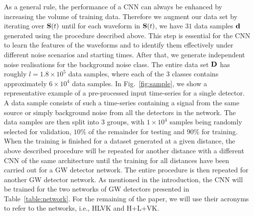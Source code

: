 \documentclass[aps,twocolumn,showpacs,groupedaddress, nofootinbib]{revtex4}  %
\newcommand{\cm}[1]{\textbf{\textcolor{red}{CM: #1}}}
\begin{document}
%
%
As a general rule, the performance of a \ac{CNN} can always be enhanced by
increasing the volume of training data. Therefore we augment our data set by
iterating over $\bold{S}(t)$ until for each waveform in $\bold{S}(t)$, we have
$31$ data samples $\bold{d}$ generated using the procedure described above.
This step is essential for the \ac{CNN} to learn the features of the waveforms
and to identify them effectively under different noise scenarios and starting
times.  After that, we generate independent noise realisations for the
background noise class. The entire data set $\bold{D}$ has
roughly $l = 1.8 \times 10^{5}$ data samples, where each of the 3 classes
contains approximately $6\times10^{4}$ data samples.
%
%
%
%
In Fig.~\ref{fig:sample}, we show a representative example of a pre-processed
input time-series for a single detector. A data sample consists of such a
time-series containing a signal from the same source or simply background noise
from all the detectors in the network. The data samples are then split into 3
groups, with $1\times10^{4}$ samples being randomly selected for validation,
$10\%$ of the remainder for testing and $90\%$ for training. When the training
is finished for a dataset generated at a given distance, the above described
procedure will be repeated for another distance with a different \ac{CNN} of 
the same architecture until the training for all
distances have been carried out for a \ac{GW} detector network. The entire
procedure is then repeated for another \ac{GW} detector network. 
As mentioned in the introduction, the \ac{CNN} will be trained for the two networks of
\ac{GW} detectors presented in Table~\ref{table:network}. For the remaining of
the paper, we will use their acronyms to refer to the networks, i.e., HLVK and H+L+VK.
\end{document}
